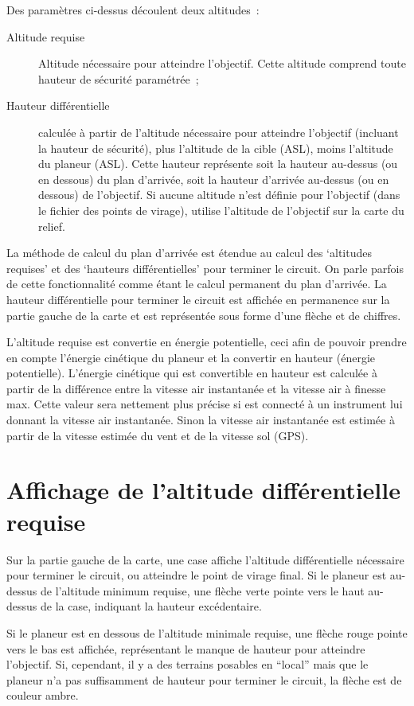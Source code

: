 Des paramètres ci-dessus découlent deux altitudes~:
\begin{description}
\item[Altitude requise] Altitude nécessaire pour atteindre l'objectif.
Cette altitude comprend toute hauteur de sécurité paramétrée~;
\item[Hauteur différentielle] calculée à partir de l'altitude nécessaire pour atteindre l'objectif (incluant la hauteur de sécurité), plus l'altitude de la cible (ASL), moins l'altitude du planeur (ASL).
Cette hauteur représente soit la hauteur au-dessus (ou en dessous) du plan d'arrivée, soit la hauteur d'arrivée au-dessus (ou en dessous) de l'objectif.
Si aucune altitude n'est définie pour l'objectif (dans le fichier des points de virage), \xc{} utilise l'altitude de l'objectif sur la carte du relief.
\end{description}

La méthode de calcul du plan d'arrivée est étendue au calcul des `altitudes requises' et des `hauteurs différentielles' pour terminer le circuit.
On parle parfois de cette fonctionnalité comme étant le calcul permanent du plan d'arrivée.
La hauteur différentielle pour terminer le circuit est affichée en permanence sur la partie gauche de la carte et est représentée sous forme d'une flèche et de chiffres.

L'altitude requise est convertie en énergie potentielle, ceci afin de pouvoir prendre en compte l'énergie cinétique du planeur et la convertir en hauteur (énergie potentielle).
L'énergie cinétique qui est convertible en hauteur est calculée à partir de la différence entre la vitesse air instantanée et la vitesse air à finesse max.
Cette valeur sera nettement plus précise si \xc{} est connecté à un instrument lui donnant la vitesse air instantanée.
Sinon la vitesse air instantanée est estimée à partir de la vitesse estimée du vent et de la vitesse sol (GPS).


\section{Affichage de l'altitude différentielle requise}

Sur la partie gauche de la carte, une case affiche l'altitude différentielle nécessaire pour terminer le circuit, ou atteindre le point de virage final.
Si le planeur est au-dessus de l'altitude minimum requise, une flèche verte pointe vers le haut au-dessus de la case, indiquant la hauteur excédentaire.

Si le planeur est en dessous de l'altitude minimale requise, une flèche rouge pointe vers le bas est affichée, représentant le manque de hauteur pour atteindre l'objectif.
Si, cependant, il y a des terrains posables en ``local'' mais que le planeur n'a pas suffisamment de hauteur pour terminer le circuit, la flèche est de couleur ambre.

